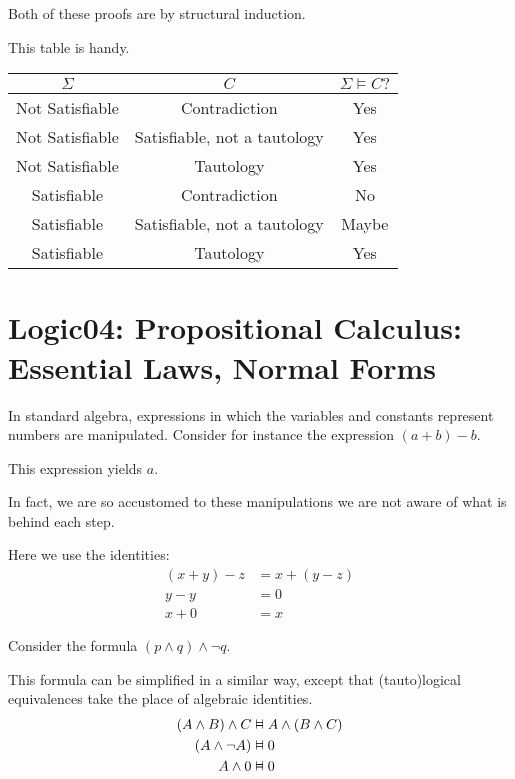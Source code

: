 \documentclass{article}
\newcommand{\vDashv}{%
  \mathrel{%
    \text{%
      \ooalign{$\vDash$\cr\reflectbox{$\vDash$}\cr}%
    }%
  }%
}
\begin{document}
Both of these proofs are by structural induction. 

This table is handy.


\begin{table}[h]
    \centering
    \begin{tabular}{|c|c|c|} \hline
         $\Sigma$&  $C$& $\Sigma \vDash C?$\\ \hline
         Not Satisfiable&  Contradiction& Yes\\
         Not Satisfiable&  Satisfiable, not a tautology& Yes\\
         Not Satisfiable&  Tautology& Yes\\ \hline
         Satisfiable&  Contradiction& No\\
         Satisfiable&  Satisfiable, not a tautology& Maybe\\
         Satisfiable&  Tautology& Yes\\ \hline
    \end{tabular}
\end{table}


\section{Logic04: Propositional Calculus: Essential Laws, Normal Forms}

In standard algebra, expressions in which the variables and constants represent numbers are manipulated. Consider for instance the expression $(a + b) - b$. 

This expression yields $a$. 

In fact, we are so accustomed to these manipulations we are not aware of what is behind each step. 

Here we use the identities:
\begin{align*}
(x + y) - z &= x + ( y - z )  \\
y - y &= 0 \\
x + 0 &= x
\end{align*}

Consider the formula $(p \wedge q) \wedge \neg q$.

This formula can be simplified in a similar way, except that (tauto)logical equivalences take the place of algebraic identities. 
\begin{align*}
(A \wedge B) \wedge C &\vDashv A \wedge (B \wedge C) \\
(A \wedge \neg A) &\vDashv 0 \\
A \wedge 0 &\vDashv 0
\end{align*}
\end{document}
